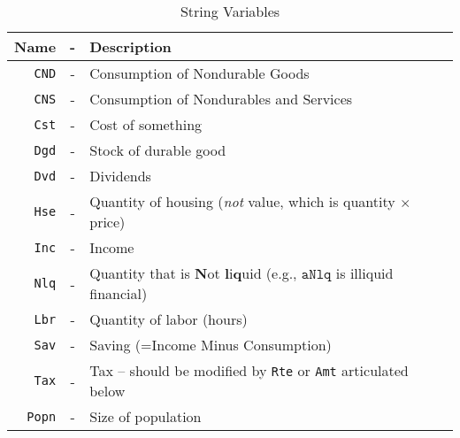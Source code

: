 \documentclass[12pt]{\econtex}
\begin{document}
\hypertarget{Standard-Variable-Names}{}
\begin{table}[ht]
  \centering
  \begin{tabular}{|rcl|}
    \hline
    Name & - & Description 
    \\ \hline
    \texttt{CND}    & - & Consumption of Nondurable Goods 
    \\   \texttt{CNS}    & - & Consumption of Nondurables and Services
    \\  \texttt{Cst}    & - & Cost of something 
    \\  \texttt{Dgd}    & - & Stock of durable good
    \\  \texttt{Dvd}    & - & Dividends 
    \\  \texttt{Hse}    & - & Quantity of housing (\textit{not} value, which is quantity $\times$ price)
    \\  \texttt{Inc}    & - & Income
    \\  \texttt{Nlq}    & - & Quantity that is \textbf{N}ot \textbf{l}i\textbf{q}uid (e.g., $\mathtt{aNlq}$ is illiquid financial)
    \\  \texttt{Lbr}    & - & Quantity of labor (hours)
    \\  \texttt{Sav}    & - & Saving (=Income Minus Consumption)
    \\  \texttt{Tax}    & - & Tax -- should be modified by \texttt{Rte} or \texttt{Amt} articulated below
    \\  \texttt{Popn}    & - & Size of population
    \\ \hline
  \end{tabular}
  \caption{String Variables}
  \label{table:Standard-Variable-Names}
\end{table}
\end{document}
